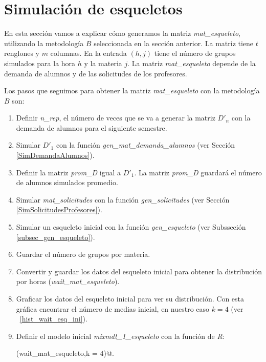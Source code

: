 \section{Simulación de esqueletos}
En esta sección vamos a explicar cómo generamos la matriz \textit{mat\_esqueleto}, utilizando la metodología $B$ seleccionada en la sección anterior. La matriz tiene $t$ renglones y $m$ columnas. En la entrada $(h,j)$ tiene el número de grupos simulados para la hora $h$ y la materia $j$. La matriz \textit{mat\_esqueleto} depende de la demanda de alumnos y de las solicitudes de los profesores.


Los pasos que seguimos para obtener la matriz \textit{mat\_esqueleto} con la metodología $B$ son:

\begin{enumerate}
\item Definir \textit{n\_rep}, el número de veces que se va a generar la matriz $D'_{n}$ con la demanda de alumnos para el siguiente semestre.

\item Simular $D'_{1}$ con la función \textit{gen\_mat\_demanda\_alumnos} (ver Sección \ref{SimDemandaAlumnos}).

\item Definir la matriz \textit{prom\_D} igual a $D'_{1}$. La matriz \textit{prom\_D} guardará el número de alumnos simulados promedio.

\item Simular \textit{mat\_solicitudes} con la función \textit{gen\_solicitudes} (ver Sección \ref{SimSolicitudesProfesores}).

\item Simular un esqueleto inicial con la función \textit{gen\_esqueleto} (ver Subsseción \ref{subsec_gen_esqueleto}).

\item Guardar el número de grupos por materia.

\item Convertir y guardar los datos del esqueleto inicial para obtener la distribución por horas (\textit{wait\_mat\_esqueleto}).

\item Graficar los datos del esqueleto inicial para ver su distribución. Con esta gráfica encontrar el número de medias inicial, en nuestro caso $k = 4$ (ver \figurename{~\ref{hist_wait_esq_ini}}).

\item Definir el modelo inicial \textit{mixmdl\_1\_esqueleto} con la función de \textit{R}:

\verb@normalmixEM(wait_mat_esqueleto,k = 4)@.
\end{enumerate}


